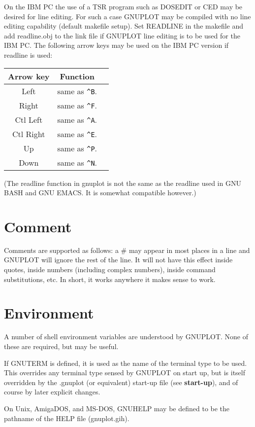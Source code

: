 On the IBM PC the use of a TSR program such as DOSEDIT or CED may be
desired for line editing. For such a case GNUPLOT may be compiled with
no line editing capability (default makefile setup). Set READLINE in the
makefile and add readline.obj to the link file if GNUPLOT line editing
is to be used for the IBM PC. The following arrow keys may be used
on the IBM PC version if readline is used:


\begin{center}
\begin{tabular}{|ccl|} \hline
Arrow key & Function & \\ \hline 
Left      & same as \verb~^B~. & \\
Right     & same as \verb~^F~. & \\
Ctl Left  & same as \verb~^A~. & \\
Ctl Right & same as \verb~^E~. & \\
Up        & same as \verb~^P~. & \\
Down      & same as \verb~^N~. & \\
\hline
\end{tabular}
\end{center}
(The readline function in gnuplot is not the same as the readline used
in GNU BASH and GNU EMACS.  It is somewhat compatible however.) 
\section{Comment}
Comments are supported as follows: a \# may appear in most places in a line
and GNUPLOT will ignore the rest of the line. It will not have this
effect inside quotes, inside numbers (including complex numbers), inside
command substitutions, etc. In short, it works anywhere it makes sense
to work.
\section{Environment}
A number of shell environment variables are understood by GNUPLOT.
None of these are required, but may be useful.

If GNUTERM is defined, it is used as the name of the terminal type to
be used. This overrides any terminal type sensed by GNUPLOT on start
up, but is itself overridden by the .gnuplot (or equivalent) start-up
file (see {\bf start-up}), and of course by later explicit changes.

On Unix, AmigaDOS, and MS-DOS, GNUHELP may be defined to be the pathname
of the HELP file (gnuplot.gih).

